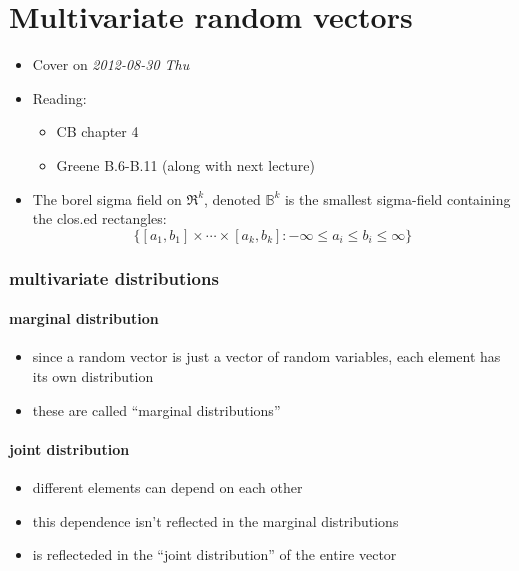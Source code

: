 
\part*{Multivariate random vectors}%

\begin{itemize}
\item Cover on \textit{2012-08-30 Thu}
\item Reading:
\begin{itemize}
\item CB chapter 4
\item Greene B.6-B.11 (along with next lecture)
\end{itemize}
\item The borel sigma field on $\Re^k$, denoted $\mathbb{B}^k$ is the
     smallest sigma-field containing the clos.ed
     rectangles: \[\{[a_1,b_1] \times \cdots \times [a_k,b_k] : -
     \infty \leq a_i \leq b_i \leq \infty\}\]
\end{itemize}
\section{multivariate distributions}
\label{sec-1}
\subsection{marginal distribution}
\label{sec-1-1}

\begin{itemize}
\item since a random vector is just a vector of random variables, each
       element has its own distribution
\item these are called ``marginal distributions''
\end{itemize}
\subsection{joint distribution}
\label{sec-1-2}

\begin{itemize}
\item different elements can depend on each other
\item this dependence isn't reflected in the marginal distributions
\item is reflecteded in the ``joint distribution'' of the entire vector
\end{itemize}
